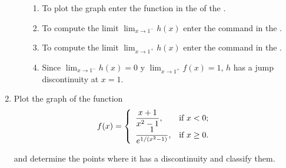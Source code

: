 \begin{enumerate}[leftmargin=*]
\begin{enumerate}
\begin{indication}
\begin{enumerate}
            \item To plot the graph enter the function  in the  of the .
            \item To compute the limit $\lim_{x\rightarrow 1^-}h(x)$ enter the command  in the .
            \item To compute the limit $\lim_{x\rightarrow 1^+}h(x)$ enter the command  in the .
            \item Since $\lim_{x\rightarrow 1^-}h(x)=0$ y $\lim_{x\rightarrow 1^+}f(x)=1$, $h$ has a jump discontinuity at $x=1$.
            \end{enumerate}
            \end{indication}
      \end{enumerate}


\item Plot the graph of the function
      \[
      f(x)=
      \left\{
      \begin{array}{ll}
      \dfrac{x+1}{x^2-1},       & \hbox{if $x<0$;}     \\
      \dfrac{1}{e^{1/(x^2-1)}}, & \hbox{if $x\geq 0$.} \\
      \end{array}
      \right.
      \]

      and determine the points where it has a discontinuity and classify them.


\end{enumerate}
